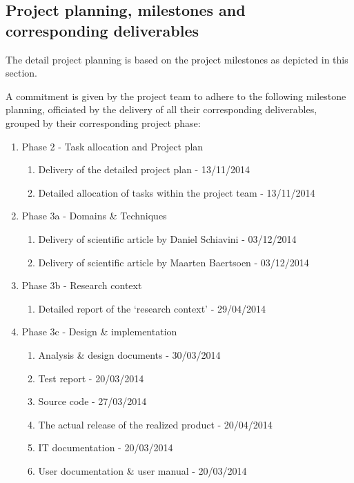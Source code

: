 \subsection{Project planning, milestones and corresponding deliverables}
\label{subsec:planning-milestones-deliverables}
The detail project planning is based on the project milestones as depicted in this section.

A commitment is given by the project team to adhere to the following milestone planning, officiated by the delivery of all their corresponding deliverables, grouped by their corresponding project phase:

 \begin{enumerate}
	\item Phase 2 - Task allocation and Project plan
 	\begin{enumerate}
		\item Delivery of the detailed project plan 			-	13/11/2014
		\item Detailed allocation of tasks within the project team 	- 	13/11/2014
	\end {enumerate}
	\item Phase 3a - Domains \& Techniques
 	\begin{enumerate}
		\item Delivery of scientific article by Daniel Schiavini		- 	03/12/2014
		\item Delivery of scientific article by Maarten Baertsoen		- 	03/12/2014
	\end {enumerate}
 	\item Phase 3b - Research context
 	\begin{enumerate}
		\item Detailed report of the `research context'  		- 	29/04/2014
	\end {enumerate}
 	\item Phase 3c - Design \& implementation
 	\begin{enumerate}
		\item Analysis \& design documents  				- 	30/03/2014
		\item Test report  							- 	20/03/2014
		\item Source code  							- 	27/03/2014
		\item The actual release of the realized product  		- 	20/04/2014
		\item IT documentation  						- 	20/03/2014
		\item User documentation \& user manual  			- 	20/03/2014
	\end {enumerate}

\end{enumerate}

